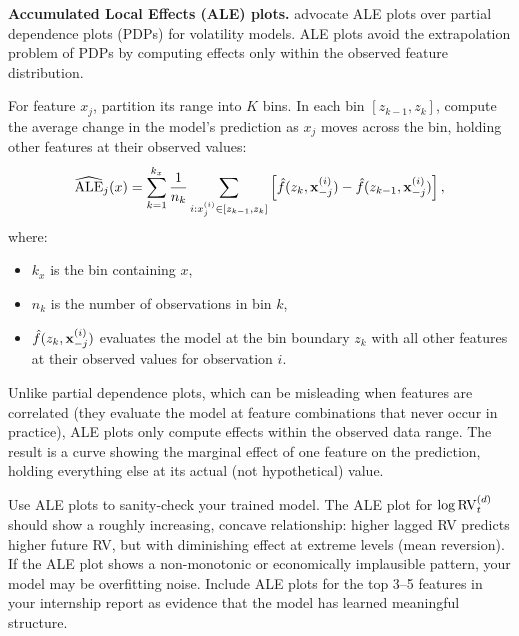 \textbf{Accumulated Local Effects (ALE) plots.}
\citet{ChristensenSiggaardVeliyev2023} advocate ALE plots over partial dependence plots (PDPs) for volatility models.
ALE plots avoid the extrapolation problem of PDPs by computing effects only within the observed feature distribution.

\begin{definition}
For feature $x_j$, partition its range into $K$ bins.
In each bin $[z_{k-1}, z_k]$, compute the average change in the model's prediction as $x_j$ moves across the bin, holding other features at their observed values:
\begin{equation}\label{eq:ale}
\widehat{\text{ALE}}_j(x) = \sum_{k=1}^{k_x} \frac{1}{n_k} \sum_{i: x_j^{(i)} \in [z_{k-1}, z_k]} \left[ \hat{f}(z_k, \mathbf{x}_{-j}^{(i)}) - \hat{f}(z_{k-1}, \mathbf{x}_{-j}^{(i)}) \right],
\end{equation}
where:
\begin{itemize}[nosep]
  \item $k_x$ is the bin containing $x$,
  \item $n_k$ is the number of observations in bin $k$,
  \item $\hat{f}(z_k, \mathbf{x}_{-j}^{(i)})$ evaluates the model at the bin boundary $z_k$ with all other features at their observed values for observation $i$.
\end{itemize}
\end{definition}

\begin{intuition}
Unlike partial dependence plots, which can be misleading when features are correlated (they evaluate the model at feature combinations that never occur in practice), ALE plots only compute effects within the observed data range. The result is a curve showing the marginal effect of one feature on the prediction, holding everything else at its actual (not hypothetical) value.
\end{intuition}

\begin{projectconnection}
Use ALE plots to sanity-check your trained model. The ALE plot for $\log \operatorname{RV}_t^{(d)}$ should show a roughly increasing, concave relationship: higher lagged RV predicts higher future RV, but with diminishing effect at extreme levels (mean reversion). If the ALE plot shows a non-monotonic or economically implausible pattern, your model may be overfitting noise. Include ALE plots for the top 3--5 features in your internship report as evidence that the model has learned meaningful structure.
\end{projectconnection}

